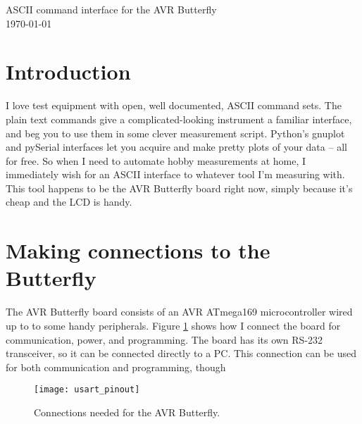 
\graphicspath{
              {figs/} %
              {pngs/} %
}







\begin{center}
	{\huge ASCII command interface for the AVR Butterfly}\\
	\today
\end{center}

\tableofcontents

\section{Introduction}
I love test equipment with open, well documented, ASCII command sets.  The plain text commands give a complicated-looking instrument a familiar interface, and beg you to use them in some clever measurement script.  Python's gnuplot and pySerial interfaces let you acquire and make pretty plots of your data -- all for free\cite{pyserial,gnuplot-py}. So when I need to automate hobby measurements at home, I immediately wish for an ASCII interface to whatever tool I'm measuring with.  This tool happens to be the AVR Butterfly board right now, simply because it's cheap and the LCD is handy.  

\section{Making connections to the Butterfly}
The AVR Butterfly board consists of an AVR ATmega169 microcontroller wired up to to some handy peripherals.  Figure \ref{fig:connections} shows how I connect the board for communication, power, and programming.  The board has its own RS-232 transceiver, so it can be connected directly to a PC.  This connection can be used for both communication and programming, though 


 

\begin{figure}[ht]
    \begin{center}
        \texttt{[image: usart\_pinout]}
        \caption{Connections needed for the AVR Butterfly.\label{fig:connections}}
    \end{center}
\end{figure}



